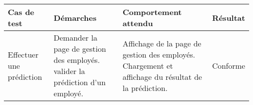 \begin{tabular}{@{}| p{}| p{5.1 cm}|p{5.2 cm}| >{\centering\arraybackslash}p{}|@{}}

\hline \rowcolor{lightgray} \hspace{1.5pc} \textbf{Cas de test}  & \hspace{1.5pc}  \textbf {Démarches} & \hspace{0.5pc}  \textbf {Comportement attendu} &   \textbf {Résultat} \\



\hline  Effectuer une prédiction & Demander la page de gestion des employés.\newline
valider la prédiction d'un employé.
& Affichage de la page de gestion des employés.\newline
Chargement et affichage du résultat de la prédiction.
& Conforme \\




\hline
\end{tabular}


